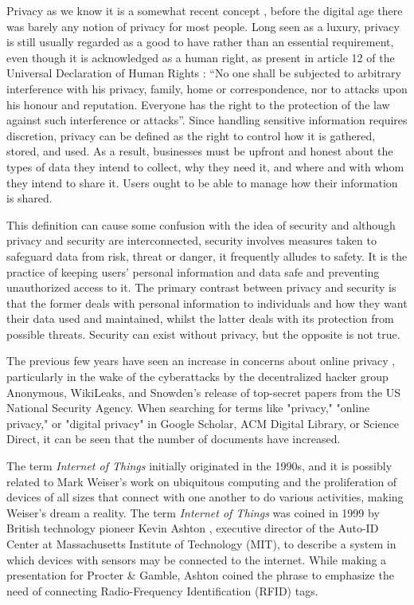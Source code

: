 \documentclass[manuscript,natbib=false]{acmart}
\begin{document}
Privacy as we know it is a somewhat recent concept \cite{vincent2016privacy, moore2017privacy},
before the digital age there was barely any notion of privacy for most
people. Long seen as a luxury, privacy
is still usually regarded as a good to have rather than an essential
requirement, even though it is acknowledged as a human right, as present
in article 12 of the Universal Declaration of Human Rights \cite{RooseveltUniversal}:
``No one shall be subjected to arbitrary interference with his privacy,
family, home or correspondence, nor to attacks upon his honour and reputation.
Everyone has the right to the protection of the law against such interference
or attacks''. Since handling sensitive information requires discretion, privacy
can be defined \cite{InternationalWhat, SpiekermannEngineering}
as the right to control how it is gathered, stored, and used. As a result,
businesses must be upfront and honest about the types of data they intend to
collect, why they need it, and where and with whom they intend to share it.
Users ought to be able to manage how their information is shared.

This definition can cause some confusion with the idea of security \cite{HIVDifference}
and although privacy and security are interconnected, security involves
measures taken to safeguard data from risk, threat or danger, it frequently
alludes to safety. It is the practice of keeping users' personal information
and data safe and preventing unauthorized access to it. The primary contrast
between privacy and security is that the former deals with personal information
to individuals and how they want their data used and maintained, whilst
the latter deals with its protection from possible threats. Security can
exist without privacy, but the opposite is not true.

The previous few years have seen an increase in concerns about online privacy \cite{emami2019exploring, park2022personal, zhang2022peer},
particularly in the wake of the cyberattacks by the decentralized hacker
group Anonymous, WikiLeaks, and Snowden's release of top-secret papers
from the US National Security Agency. When searching for terms like "privacy,"
"online privacy," or "digital privacy" in Google Scholar, ACM Digital Library,
or Science Direct, it can be seen that the number of documents have increased.

The term \textit{Internet of Things} initially originated in the 1990s, and it is
possibly related to Mark Weiser's work on ubiquitous computing \cite{weiser1991computer}
and the proliferation
of devices of all sizes that connect with one another to do various activities,
making Weiser's dream a reality. The term \textit{Internet of Things} was coined in
1999 by British technology pioneer Kevin Ashton \cite{KevinThat}, executive director of the
Auto-ID Center at Massachusetts Institute of Technology (MIT), to describe
a system in which devices with sensors may be connected to the internet.
While making a presentation for Procter \& Gamble, Ashton coined the phrase
to emphasize the need of connecting Radio-Frequency Identification (RFID) tags.
\end{document}
